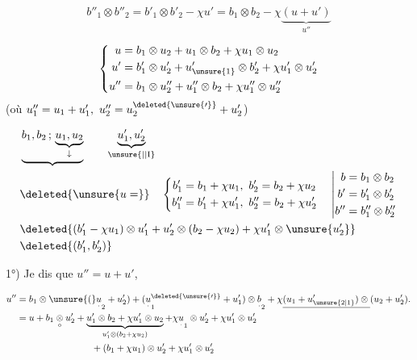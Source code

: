 \[
b''_1\otimes b''_2=b'_1\otimes b'_2-\chi u'
=b_1\otimes b_2-\chi\underbrace{(u+u')}_{u''}
\]


\[
\left\{\begin{aligned}
u&=b_1\otimes u_2+u_1\otimes b_2+\chi u_1\otimes u_2\\
u'&=b'_1\otimes u'_2+u'_{\unsure{1}}\otimes b'_2+\chi u'_1\otimes u'_2\\
u''&=b_1\otimes u''_2+u''_1\otimes b_2+\chi u''_1\otimes u''_2
\end{aligned}\right.
\]
(où $u''_1=u_1+u'_1,\ u''_2=u_2^{\deleted{\unsure{\prime}}}+u'_2$)

\[
\begin{aligned}
&\underbrace{b_1,b_2\,;\,\underbrace{u_1,u_2}_{\downarrow}} \qquad
 \underbrace{u'_1,u'_2}_{\unsure{\vert|\mathrm{I}}}\\
&\deleted{\unsure{u=}}\quad
\left\{\begin{aligned}
 b'_1&=b_1+\chi u_1,\ b'_2=b_2+\chi u_2\\
 b''_1&=b'_1+\chi u'_1,\ b''_2=b_2+\chi u'_2
\end{aligned}\right.
\quad\left|\begin{aligned}
 b&=b_1\otimes b_2\\ b'&=b'_1\otimes b'_2\\ b''&=b''_1\otimes b''_2
\end{aligned}\right.\\
&\deleted{(b'_1-\chi u_1)\otimes u'_1+u'_2\otimes(b_2-\chi u_2)+\chi u'_1\otimes\unsure{u'_2}}\\
&\deleted{(b'_1,b'_2)}
\end{aligned}
\]

1°) Je dis que $u''=u+u'$, 

\[
\begin{aligned}
u''&=b_1\otimes\unsure{(}\underset{\cdot}{u}_2+u'_2)+(\underset{\cdot}{u}_1^{\deleted{\unsure{\prime}}}+u'_1)\otimes \underset{\cdot}{b}_2+\chi\underline{(u_1+u_{\unsure{2|1}}')\otimes{}}(u_2+u'_2).\\
&=u+b_1\underset{\circ}{\otimes} u'_2+
\underbrace{u'_1\otimes b_2+\chi u'_1\otimes u_2}_{u'_1\otimes(b_2+\chi u_2)}
+\chi\underset{\cdot}{u}_1\otimes u'_2+\chi u'_1\otimes u'_2\\
&\hspace{8em}+(b_1+\chi u_1)\otimes u'_2+\chi u'_1\otimes u'_2
\end{aligned}
\]

